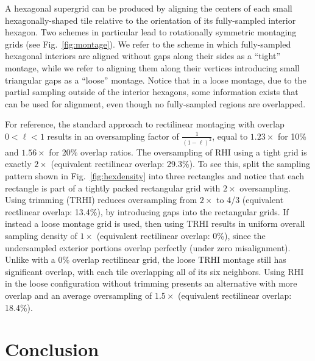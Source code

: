 \documentclass{article}
\newcommand{\reffig}[1]{Fig.~\ref{fig:#1}}
\begin{document}
A hexagonal supergrid can be produced by aligning the centers of each small
hexagonally-shaped tile relative to the orientation of its fully-sampled
interior hexagon.
%
Two schemes in particular lead to rotationally symmetric montaging grids (see \reffig{montage}).
%
We refer to the scheme in which fully-sampled hexagonal interiors are aligned
without gaps along their sides as a ``tight'' montage, while we refer to
aligning them along their vertices introducing small triangular gaps as a
``loose'' montage.
%
Notice that in a loose montage, due to the partial sampling outside of the
interior hexagons, some information exists that can be used for alignment, even
though no fully-sampled regions are overlapped.



For reference, the standard approach to rectilinear montaging with overlap
$0<\ell<1$ results in an oversampling factor of $\frac{1}{(1-\ell)^2}$, equal to
$1.23\times$ for 10\% and $1.56\times$ for 20\% overlap ratios.
%
The oversampling of RHI using a tight grid is exactly $2\times$ (equivalent rectilinear
overlap: 29.3\%).
%
To see this, split the sampling pattern shown in \reffig{hexdensity} into three
rectangles and notice that each rectangle is part of a tightly packed
rectangular grid with $2\times$ oversampling.
%
Using trimming (TRHI) reduces oversampling from $2\times$ to 4/3 (equivalent rectlinear
overlap: 13.4\%), by introducing gaps into the rectangular grids.
%
If instead a loose montage grid is used, then using TRHI results in uniform
overall sampling density of $1\times$ (equivalent rectilinear overlap: 0\%), since the
undersampled exterior portions overlap perfectly (under zero misalignment).
%
Unlike with a 0\% overlap rectilinear grid, the loose TRHI montage still has
significant overlap, with each tile overlapping all of its six neighbors.
%
Using RHI in the loose configuration without trimming presents an alternative
with more overlap and an average oversampling of $1.5\times$ (equivalent rectilinear
overlap: 18.4\%).


\section{Conclusion}
\label{sec:conclusion}
\end{document}
